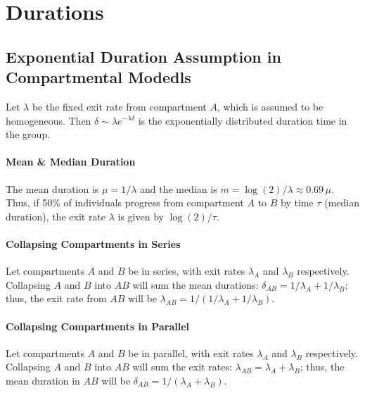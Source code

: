 \section{Durations}\label{app.math.dur}
\subsection{Exponential Duration Assumption in Compartmental Modedls}\label{app.math.dur.exp}
Let $\lambda$ be the fixed exit rate from compartment $A$, which is assumed to be homogeneous.
Then $\delta \sim \lambda e^{-\lambda \delta}$ is %
the exponentially distributed duration time in the group.
\paragraph{Mean \& Median Duration}
The mean duration is $\mu = 1/\lambda$ and the median is $m = \log(2)/\lambda \approx 0.69\,\mu$.
Thus, if 50\% of individuals progress from compartment $A$ to $B$ by time $\tau$ (median duration),
the exit rate $\lambda$ is given by $\log(2)/\tau$.
\paragraph{Collapsing Compartments in Series}
Let compartments $A$ and $B$ be in series, with exit rates $\lambda_A$ and $\lambda_B$ respectively.
Collapsing $A$ and $B$ into $AB$ will sum the mean durations: $\delta_{AB} = 1/\lambda_A + 1/\lambda_B$;
thus, the exit rate from $AB$ will be $\lambda_{AB} = 1/(1/\lambda_A + 1/\lambda_B)$.
\paragraph{Collapsing Compartments in Parallel}
Let compartments $A$ and $B$ be in parallel, with exit rates $\lambda_A$ and $\lambda_B$ respectively.
Collapsing $A$ and $B$ into $AB$ will sum the exit rates: $\lambda_{AB} = \lambda_A + \lambda_B$;
thus, the mean duration in $AB$ will be $\delta_{AB} = 1/(\lambda_A + \lambda_B)$.
